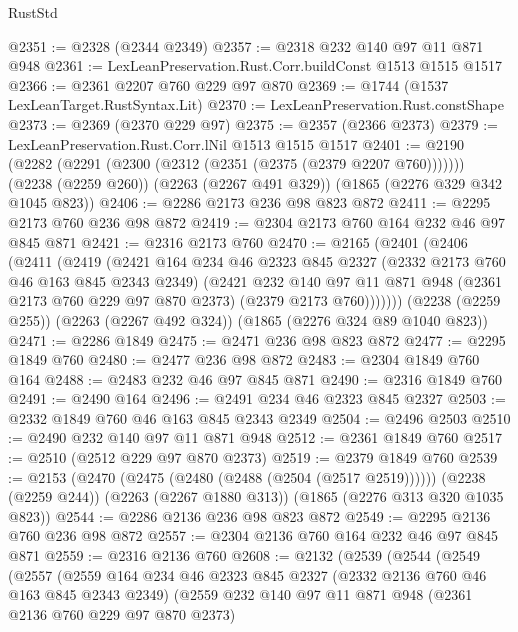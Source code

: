 \begin{lexlean}{RustStd}
\begin{coremodule}
@2351 := @2328 (@2344 @2349)
@2357 := @2318 @232 @140 @97 @11 @871 @948
@2361 := LexLeanPreservation.Rust.Corr.buildConst @1513 @1515 @1517
@2366 := @2361 @2207 @760 @229 @97 @870
@2369 := @1744 (@1537 LexLeanTarget.RustSyntax.Lit)
@2370 := LexLeanPreservation.Rust.constShape
@2373 := @2369 (@2370 @229 @97)
@2375 := @2357 (@2366 @2373)
@2379 := LexLeanPreservation.Rust.Corr.lNil @1513 @1515 @1517
@2401 := @2190
    (@2282 (@2291 (@2300 (@2312 (@2351 (@2375 (@2379 @2207 @760)))))))
    (@2238 (@2259 @260))
    (@2263 (@2267 @491 @329))
    (@1865 (@2276 @329 @342 @1045 @823))
@2406 := @2286 @2173 @236 @98 @823 @872
@2411 := @2295 @2173 @760 @236 @98 @872
@2419 := @2304 @2173 @760 @164 @232 @46 @97 @845 @871
@2421 := @2316 @2173 @760
@2470 := @2165
    (@2401
      (@2406
        (@2411
          (@2419
            (@2421
              @164
              @234
              @46
              @2323
              @845
              @2327
              (@2332 @2173 @760 @46 @163 @845 @2343 @2349)
              (@2421
                @232
                @140
                @97
                @11
                @871
                @948
                (@2361 @2173 @760 @229 @97 @870 @2373)
                (@2379 @2173 @760)))))))
    (@2238 (@2259 @255))
    (@2263 (@2267 @492 @324))
    (@1865 (@2276 @324 @89 @1040 @823))
@2471 := @2286 @1849
@2475 := @2471 @236 @98 @823 @872
@2477 := @2295 @1849 @760
@2480 := @2477 @236 @98 @872
@2483 := @2304 @1849 @760 @164
@2488 := @2483 @232 @46 @97 @845 @871
@2490 := @2316 @1849 @760
@2491 := @2490 @164
@2496 := @2491 @234 @46 @2323 @845 @2327
@2503 := @2332 @1849 @760 @46 @163 @845 @2343 @2349
@2504 := @2496 @2503
@2510 := @2490 @232 @140 @97 @11 @871 @948
@2512 := @2361 @1849 @760
@2517 := @2510 (@2512 @229 @97 @870 @2373)
@2519 := @2379 @1849 @760
@2539 := @2153
    (@2470 (@2475 (@2480 (@2488 (@2504 (@2517 @2519))))))
    (@2238 (@2259 @244))
    (@2263 (@2267 @1880 @313))
    (@1865 (@2276 @313 @320 @1035 @823))
@2544 := @2286 @2136 @236 @98 @823 @872
@2549 := @2295 @2136 @760 @236 @98 @872
@2557 := @2304 @2136 @760 @164 @232 @46 @97 @845 @871
@2559 := @2316 @2136 @760
@2608 := @2132
    (@2539
      (@2544
        (@2549
          (@2557
            (@2559
              @164
              @234
              @46
              @2323
              @845
              @2327
              (@2332 @2136 @760 @46 @163 @845 @2343 @2349)
              (@2559
                @232
                @140
                @97
                @11
                @871
                @948
                (@2361 @2136 @760 @229 @97 @870 @2373)

\end{coremodule}
\end{lexlean}
